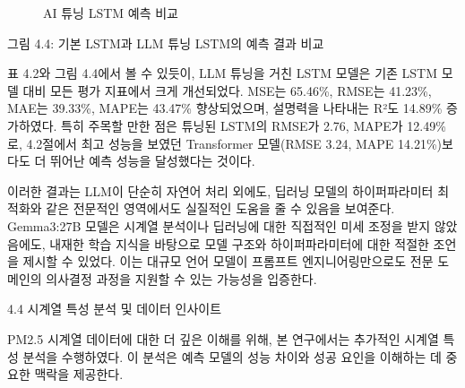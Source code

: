 \documentclass[12pt,ko,a4,]{report}
\begin{document}
\begin{figure}
\centering
{}
\caption{AI 튜닝 LSTM 예측 비교}
\end{figure}

그림 4.4: 기본 LSTM과 LLM 튜닝 LSTM의 예측 결과 비교

표 4.2와 그림 4.4에서 볼 수 있듯이, LLM 튜닝을 거친 LSTM 모델은 기존
LSTM 모델 대비 모든 평가 지표에서 크게 개선되었다. MSE는 65.46\%, RMSE는
41.23\%, MAE는 39.33\%, MAPE는 43.47\% 향상되었으며, 설명력을 나타내는
R²도 14.89\% 증가하였다. 특히 주목할 만한 점은 튜닝된 LSTM의 RMSE가
2.76, MAPE가 12.49\%로, 4.2절에서 최고 성능을 보였던 Transformer
모델(RMSE 3.24, MAPE 14.21\%)보다도 더 뛰어난 예측 성능을 달성했다는
것이다.

이러한 결과는 LLM이 단순히 자연어 처리 외에도, 딥러닝 모델의
하이퍼파라미터 최적화와 같은 전문적인 영역에서도 실질적인 도움을 줄 수
있음을 보여준다. Gemma3:27B 모델은 시계열 분석이나 딥러닝에 대한
직접적인 미세 조정을 받지 않았음에도, 내재한 학습 지식을 바탕으로 모델
구조와 하이퍼파라미터에 대한 적절한 조언을 제시할 수 있었다. 이는 대규모
언어 모델이 프롬프트 엔지니어링만으로도 전문 도메인의 의사결정 과정을
지원할 수 있는 가능성을 입증한다.

4.4 시계열 특성 분석 및 데이터 인사이트

PM2.5 시계열 데이터에 대한 더 깊은 이해를 위해, 본 연구에서는 추가적인
시계열 특성 분석을 수행하였다. 이 분석은 예측 모델의 성능 차이와 성공
요인을 이해하는 데 중요한 맥락을 제공한다.
\end{document}
